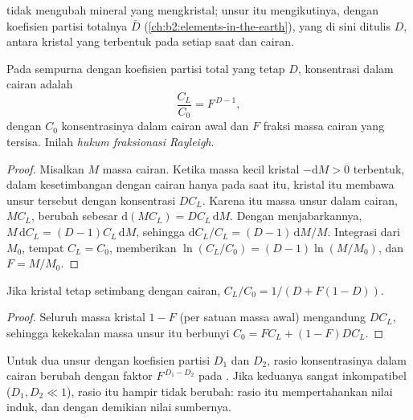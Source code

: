  tidak mengubah mineral yang mengkristal; unsur itu mengikutinya,
dengan koefisien partisi totalnya $\bar D$ (\cref{ch:b2:elements-in-the-earth}),
yang di sini ditulis $D$, antara kristal yang terbentuk pada setiap saat dan cairan.

\begin{theorem}\label{thm:b2:magmatic-differentiation:rayleigh}
Pada  sempurna dengan koefisien partisi total yang tetap
$D$, konsentrasi  dalam cairan adalah
\[
\frac{C_L}{C_0} = F^{\,D-1},
\]
dengan $C_0$ konsentrasinya dalam cairan awal dan $F$ fraksi massa
cairan yang tersisa. Inilah \emph{hukum fraksionasi Rayleigh}.

\end{theorem}

\begin{proof}
Misalkan $M$ massa cairan. Ketika massa kecil kristal $-\mathrm dM > 0$
terbentuk, dalam kesetimbangan dengan cairan hanya pada saat itu, kristal itu membawa unsur tersebut dengan
konsentrasi $DC_L$. Karena itu massa unsur dalam cairan, $MC_L$, berubah
sebesar $\mathrm d(MC_L) = DC_L\,\mathrm dM$. Dengan menjabarkannya, $M\,\mathrm dC_L = (D-1)C_L\,
\mathrm dM$, sehingga $\mathrm dC_L/C_L = (D-1)\,\mathrm dM/M$. Integrasi dari $M_0$,
tempat $C_L = C_0$, memberikan $\ln(C_L/C_0) = (D-1)\ln(M/M_0)$, dan $F = M/M_0$.
\end{proof}

\begin{proposition}
\label{prop:b2:magmatic-differentiation:equilibrium}
Jika kristal tetap setimbang dengan cairan, $C_L/C_0 = 1/(D + F(1-D))$.
\end{proposition}

\begin{proof}
Seluruh massa kristal $1-F$ (per satuan massa awal) mengandung $DC_L$, sehingga kekekalan
massa unsur itu berbunyi $C_0 = FC_L + (1-F)DC_L$.
\end{proof}

\begin{corollary}\label{cor:b2:magmatic-differentiation:ratio}
Untuk dua unsur dengan koefisien partisi $D_1$ dan $D_2$, rasio
konsentrasinya dalam cairan berubah dengan faktor $F^{\,D_1-D_2}$ pada . Jika keduanya sangat inkompatibel ($D_1, D_2 \ll 1$), rasio itu
hampir tidak berubah: rasio itu mempertahankan nilai  induk, dan dengan demikian nilai sumbernya.
\end{corollary}

